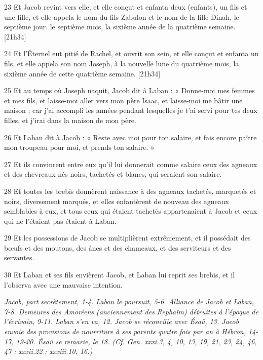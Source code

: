 \par 23 Et Jacob revint vers elle, et elle conçut et enfanta deux (enfants), un fils et une fille, et elle appela le nom du fils Zabulon et le nom de la fille Dinah, le septième jour. le septième mois, la sixième année de la quatrième semaine. [21h34]
\par 24 Et l'Éternel eut pitié de Rachel, et ouvrit son sein, et elle conçut et enfanta un fils, et elle appela son nom Joseph, à la nouvelle lune du quatrième mois, la sixième année de cette quatrième semaine. [21h34]
\par 25 Et au temps où Joseph naquit, Jacob dit à Laban : « Donne-moi mes femmes et mes fils, et laisse-moi aller vers mon père Isaac, et laisse-moi me bâtir une maison ; car j'ai accompli les années pendant lesquelles je t'ai servi pour tes deux filles, et j'irai dans la maison de mon père.
\par 26 Et Laban dit à Jacob : « Reste avec moi pour ton salaire, et fais encore paître mon troupeau pour moi, et prends ton salaire. »
\par 27 Et ils convinrent entre eux qu'il lui donnerait comme salaire ceux des agneaux et des chevreaux nés noirs, tachetés et blancs, qui seraient son salaire.
\par 28 Et toutes les brebis donnèrent naissance à des agneaux tachetés, marquetés et noirs, diversement marqués, et elles enfantèrent de nouveau des agneaux semblables à eux, et tous ceux qui étaient tachetés appartenaient à Jacob et ceux qui ne l'étaient pas étaient à Laban.
\par 29 Et les possessions de Jacob se multiplièrent extrêmement, et il possédait des bœufs et des moutons, des ânes et des chameaux, et des serviteurs et des servantes.
\par 30 Et Laban et ses fils envièrent Jacob, et Laban lui reprit ses brebis, et il l'observa avec une mauvaise intention.


\par \textit{Jacob, part secrètement, 1-4. Laban le poursuit, 5-6. Alliance de Jacob et Laban, 7-8. Demeures des Amoréens (anciennement des Rephaïm) détruites à l'époque de l'écrivain, 9-11. Laban s'en va, 12. Jacob se réconcilie avec Ésaü, 13. Jacob envoie des provisions de nourriture à ses parents quatre fois par an à Hébron, 14-17, 19-20. Ésaü se remarie, le 18. (Cf. Gen. xxxi.3, 4, 10, 13, 19, 21, 23, 24, 46, 47 ; xxxii.22 ; xxxiii.10, 16.)}

